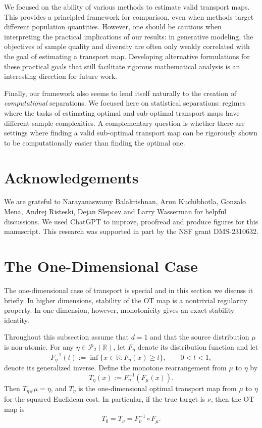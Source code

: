 \documentclass[11pt,twoside]{article}
\begin{document}
We focused on the ability of various methods to estimate valid transport maps. This provides a principled framework for comparison, even when methods target different population quantities. However, one should be cautious when interpreting the practical implications of our results: in generative modeling, the objectives of sample quality and diversity are often only weakly correlated with the goal of estimating a transport map. Developing alternative formulations for these practical goals that still facilitate rigorous mathematical analysis is an interesting direction for future work.

Finally, our framework also seems to lend itself naturally to the creation of \emph{computational} separations. We focused here on statistical separations: regimes where the tasks of estimating optimal and sub-optimal transport maps have different sample complexities. A complementary question is whether there are settings where
finding a valid sub-optimal transport map can be rigorously shown to be computationally easier than finding the optimal one. 

\section*{Acknowledgements}
We are grateful to Narayanaswamy Balakrishnan, Arun Kuchibhotla, Gonzalo Mena, Andrej Risteski, Dejan Slepcev and Larry Wasserman for helpful discussions. We used ChatGPT to improve, proofread and produce figures for this manuscript. This research was supported in part by the NSF grant DMS-2310632.






\appendix

\clearpage

\section{The One-Dimensional Case}
\label{sec:oned}
The one-dimensional case of transport is special and in this section we discuss it briefly. In higher dimensions, stability of the OT map is a nontrivial regularity property. In one dimension, however, monotonicity gives an exact stability identity.

Throughout this subsection assume that $d=1$ and that the source distribution $\mu$ is non-atomic. For any $\eta\in\mathcal{P}_2(\mathbb{R})$, let $F_\eta$ denote its distribution function and let
\[
F_\eta^{-1}(t) := \inf\{x\in\mathbb{R}:F_\eta(x)\geq t\},
\qquad 0<t<1,
\]
denote its generalized inverse. Define the monotone rearrangement from $\mu$ to $\eta$ by
\[
T_\eta(x) := F_\eta^{-1}(F_\mu(x)).
\]
Then $T_{\eta\#}\mu=\eta$, and $T_\eta$ is the one-dimensional optimal transport map from $\mu$ to $\eta$ for the squared Euclidean cost. In particular, if the true target is $\nu$, then the OT map is
\[
T_0 = T_\nu = F_\nu^{-1}\circ F_\mu.
\]
\end{document}
